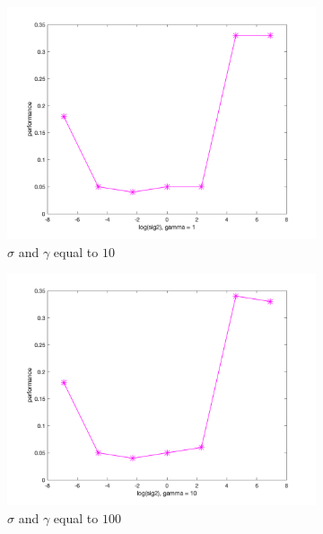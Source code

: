\documentclass[a4paper, 11pt, one column]{article}
\begin{document}
\begin{figure}[]
\begin{subfigure}{0.33\linewidth}
            \includegraphics[width=\linewidth]{images/loo_sig2_g_1.png}
            \caption{$\sigma$ and $\gamma$ equal to $10$}
        \end{subfigure}
		\begin{subfigure}{0.33\linewidth}
            \includegraphics[width=\linewidth]{images/loo_sig2_g_10.png}
            \caption{$\sigma$ and $\gamma$ equal to $100$}
        \end{subfigure}
        \begin{subfigure}{0.33\linewidth}

\end{subfigure}
\end{figure}
\end{document}
